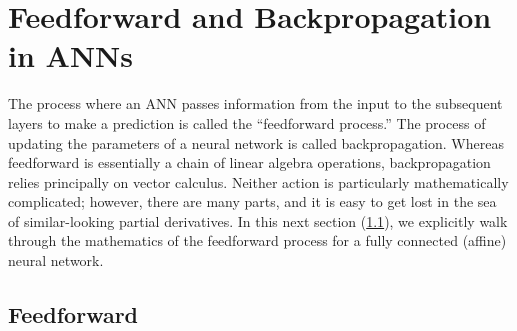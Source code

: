 \section{Feedforward and Backpropagation in ANNs}

The process where an ANN passes information from the input to the subsequent layers to make a prediction is called the ``feedforward process.'' The process of updating the parameters of a neural network is called backpropagation. Whereas feedforward is essentially a chain of linear algebra operations, backpropagation relies principally on vector calculus. Neither action is particularly mathematically complicated; however, there are many parts, and it is easy to get lost in the sea of similar-looking partial derivatives. In this next section (\ref{sec:feedfoward}), we explicitly walk through the mathematics of the feedforward process for a fully connected (affine) neural network.

\subsection{Feedforward} \label{sec:feedfoward}

